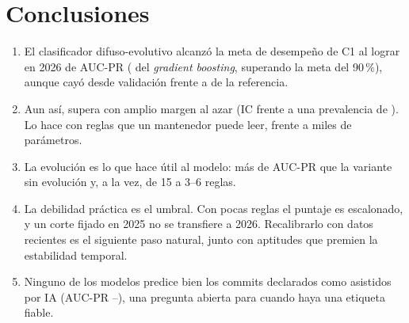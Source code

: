\section{Conclusiones}

\begin{enumerate}
\item El clasificador difuso-evolutivo alcanzó la meta de desempeño de C1 al lograr en 2026 \cifTestFE{} de AUC-PR (\cifCuno{} del \emph{gradient boosting}, superando la meta del 90\,\%), aunque cayó \cifCaidaFE{} desde validación frente a \cifCaidaGB{} de la referencia.
\item Aun así, supera con amplio margen al azar (IC \cifTestFEic{} frente a una prevalencia de \cifPrevPrueba{}). Lo hace con \cifNReglasRef{} reglas que un mantenedor puede leer, frente a miles de parámetros.
\item La evolución es lo que hace útil al modelo: \cifAporteEvolPrueba{} más de AUC-PR que la variante sin evolución y, a la vez, de 15 a 3--6 reglas.
\item La debilidad práctica es el umbral. Con pocas reglas el puntaje es escalonado, y un corte fijado en 2025 no se transfiere a 2026. Recalibrarlo con datos recientes es el siguiente paso natural, junto con aptitudes que premien la estabilidad temporal.
\item Ninguno de los modelos predice bien los commits declarados como asistidos por IA (AUC-PR \cifAssistedFE{}--\cifAssistedLR{}), una pregunta abierta para cuando haya una etiqueta fiable.
\end{enumerate}
